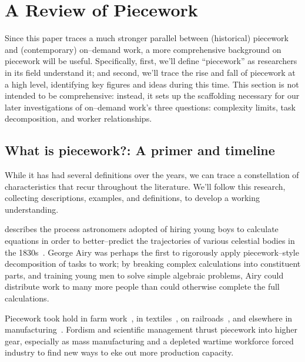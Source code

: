 \documentclass[trackingWork]{subfiles}
\begin{document}
\section{A Review of Piecework}

Since this paper traces a much stronger parallel between
(historical) piecework and (contemporary) on--demand work,
a more comprehensive background on piecework will be useful.
Specifically,
first, we'll define ``piecework'' as researchers in its field understand it;
and second, we'll trace the rise and fall of piecework at a high level,
identifying key figures and ideas during this time.
This section is not intended to be comprehensive:
instead, it sets up the scaffolding necessary for
our later investigations of on--demand work's three questions:
complexity limits,
task decomposition, and
worker relationships.




\subsection{What is piecework?: A primer and timeline}\label{sec:whatIsPiecework}

While it has had several definitions over the years,
we can trace a constellation of characteristics that recur throughout the literature.
We'll follow this research, collecting
descriptions,
examples, and
definitions,
to develop a working understanding.

\citeauthor{grier2013computers} describes the process astronomers adopted of hiring young boys
to calculate equations in order
to better--predict the trajectories of various celestial bodies in the 1830s~\cite{grier2013computers}.
George Airy was perhaps the first to rigorously apply piecework--style decomposition of tasks to work;
by breaking complex calculations into constituent parts, and
training young men to solve simple algebraic problems,
Airy could distribute work to many more people than could otherwise complete the full calculations.


Piecework took hold in farm work~\cite{hughRaynbirdTaskWork},
in textiles~\cite{restructuringPieceworkBaker,riisOtherSideLives},
on railroads~\cite{Brown01041990}, and 
elsewhere in manufacturing~\cite{10.2307/3827491}.
Fordism and scientific management thrust piecework into higher gear, especially as
mass manufacturing and
a depleted wartime workforce forced industry to find new ways to eke out more production capacity.
\end{document}
